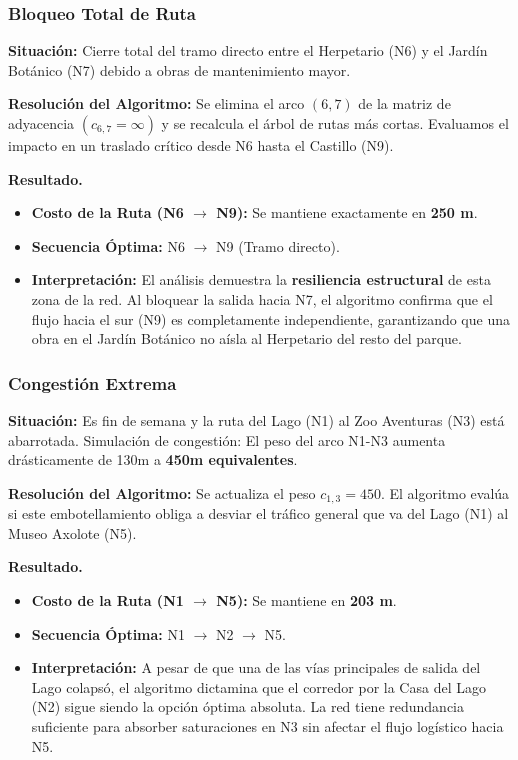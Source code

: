 \documentclass[aspectratio=169]{beamer}
\begin{document}
\begin{frame}
    \frametitle{Bloqueo Total de Ruta}
    \textbf{Situación:} Cierre total del tramo directo entre el Herpetario (N6) y el Jardín Botánico (N7) debido a obras de mantenimiento mayor.
    
    \vspace{2mm}
    \textbf{Resolución del Algoritmo:}
    Se elimina el arco $(6,7)$ de la matriz de adyacencia $\left( c_{6,7} = \infty \right)$ y se recalcula el árbol de rutas más cortas. Evaluamos el impacto en un traslado crítico desde N6 hasta el Castillo (N9).
    
    \vspace{2mm}
    \textbf{Resultado.}
    \begin{itemize}
        \item \textbf{Costo de la Ruta (N6 $\rightarrow$ N9):} Se mantiene exactamente en \textbf{250 m}.
        \item \textbf{Secuencia Óptima:} N6 $\rightarrow$ N9 (Tramo directo).
        \item \textbf{Interpretación:} El análisis demuestra la \textbf{resiliencia estructural} de esta zona de la red. Al bloquear la salida hacia N7, el algoritmo confirma que el flujo hacia el sur (N9) es completamente independiente, garantizando que una obra en el Jardín Botánico no aísla al Herpetario del resto del parque.
    \end{itemize}
\end{frame}

\begin{frame}
    \frametitle{Congestión Extrema}
    \textbf{Situación:} Es fin de semana y la ruta del Lago (N1) al Zoo Aventuras (N3) está abarrotada.
    Simulación de congestión: El peso del arco N1-N3 aumenta drásticamente de 130m a 
    \textbf{450m equivalentes}.
    
    \vspace{2mm}
    \textbf{Resolución del Algoritmo:}
    Se actualiza el peso $c_{1,3} = 450$. 
    El algoritmo evalúa si este embotellamiento obliga a desviar el tráfico general 
    que va del Lago (N1) al Museo Axolote (N5).
    
    \vspace{2mm}
    \textbf{Resultado.}
    \begin{itemize}
        \item \textbf{Costo de la Ruta (N1 $\rightarrow$ N5):} Se mantiene en \textbf{203 m}.
        \item \textbf{Secuencia Óptima:} N1 $\rightarrow$ N2 $\rightarrow$ N5.
        \item \textbf{Interpretación:} A pesar de que una de las vías principales de salida del Lago colapsó, el algoritmo dictamina que el corredor por la Casa del Lago (N2) sigue siendo la opción óptima absoluta. La red tiene redundancia suficiente para absorber saturaciones en N3 sin afectar el flujo logístico hacia N5.
    \end{itemize}
\end{frame}
\end{document}
